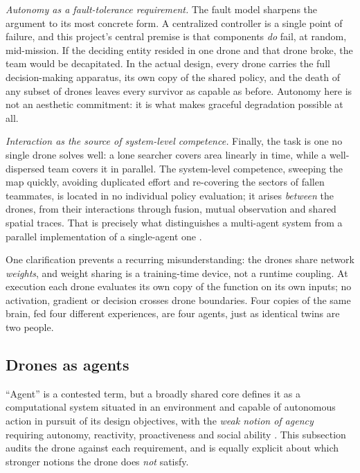 \emph{Autonomy as a fault-tolerance requirement.} The fault model sharpens the
argument to its most concrete form. A centralized controller is a single point of
failure, and this project's central premise is that components \emph{do} fail, at
random, mid-mission. If the deciding entity resided in one drone and that drone
broke, the team would be decapitated. In the actual design, every drone carries
the full decision-making apparatus, its own copy of the shared policy, and the
death of any subset of drones leaves every survivor as capable as before.
Autonomy here is not an aesthetic commitment: it is what makes graceful
degradation possible at all.

\emph{Interaction as the source of system-level competence.} Finally, the task
is one no single drone solves well: a lone searcher covers area linearly in time,
while a well-dispersed team covers it in parallel. The system-level competence,
sweeping the map quickly, avoiding duplicated effort and re-covering the sectors
of fallen teammates, is located in no individual policy evaluation; it arises
\emph{between} the drones, from their interactions through fusion, mutual
observation and shared spatial traces. That is precisely what distinguishes a
multi-agent system from a parallel implementation of a single-agent one
\citep{wooldridge2009introduction}.

One clarification prevents a recurring misunderstanding: the drones share network
\emph{weights}, and weight sharing is a training-time device, not a runtime
coupling. At execution each drone evaluates its own copy of the function on its
own inputs; no activation, gradient or decision crosses drone boundaries. Four
copies of the same brain, fed four different experiences, are four agents, just
as identical twins are two people.

\subsection{Drones as agents}
\label{subsec:mas-agents}

``Agent'' is a contested term, but a broadly shared core defines it as a
computational system situated in an environment and capable of autonomous action
in pursuit of its design objectives, with the \emph{weak notion of agency}
requiring autonomy, reactivity, proactiveness and social ability
\citep{wooldridge1995intelligent,franklin1996agent}. This subsection audits the
drone against each requirement, and is equally explicit about which stronger
notions the drone does \emph{not} satisfy.

